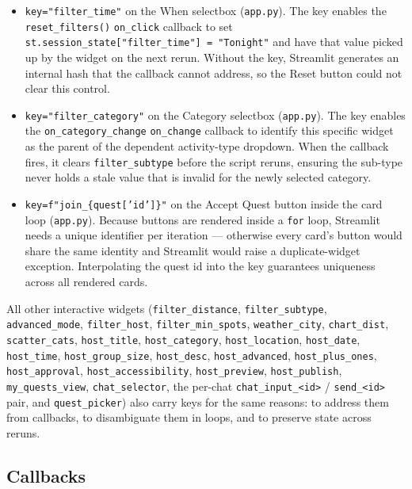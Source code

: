 \documentclass[11pt]{article}
\begin{document}
\begin{itemize}
    \item \texttt{key="filter\_time"} on the When selectbox (\texttt{app.py}). The key enables the \texttt{reset\_filters()} \texttt{on\_click} callback to set \texttt{st.session\_state["filter\_time"] = "Tonight"} and have that value picked up by the widget on the next rerun. Without the key, Streamlit generates an internal hash that the callback cannot address, so the Reset button could not clear this control.
    \item \texttt{key="filter\_category"} on the Category selectbox (\texttt{app.py}). The key enables the \texttt{on\_category\_change} \texttt{on\_change} callback to identify this specific widget as the parent of the dependent activity-type dropdown. When the callback fires, it clears \texttt{filter\_subtype} before the script reruns, ensuring the sub-type never holds a stale value that is invalid for the newly selected category.
    \item \texttt{key=f"join\_\{quest['id']\}"} on the Accept Quest button inside the card loop (\texttt{app.py}). Because buttons are rendered inside a \texttt{for} loop, Streamlit needs a unique identifier per iteration --- otherwise every card's button would share the same identity and Streamlit would raise a duplicate-widget exception. Interpolating the quest id into the key guarantees uniqueness across all rendered cards.
\end{itemize}

All other interactive widgets (\texttt{filter\_distance}, \texttt{filter\_subtype}, \texttt{advanced\_mode}, \texttt{filter\_host}, \texttt{filter\_min\_spots}, \texttt{weather\_city}, \texttt{chart\_dist}, \texttt{scatter\_cats}, \texttt{host\_title}, \texttt{host\_category}, \texttt{host\_location}, \texttt{host\_date}, \texttt{host\_time}, \texttt{host\_group\_size}, \texttt{host\_desc}, \texttt{host\_advanced}, \texttt{host\_plus\_ones}, \texttt{host\_approval}, \texttt{host\_accessibility}, \texttt{host\_preview}, \texttt{host\_publish}, \texttt{my\_quests\_view}, \texttt{chat\_selector}, the per-chat \texttt{chat\_input\_<id>} / \texttt{send\_<id>} pair, and \texttt{quest\_picker}) also carry keys for the same reasons: to address them from callbacks, to disambiguate them in loops, and to preserve state across reruns.

\subsection{Callbacks}
\end{document}
